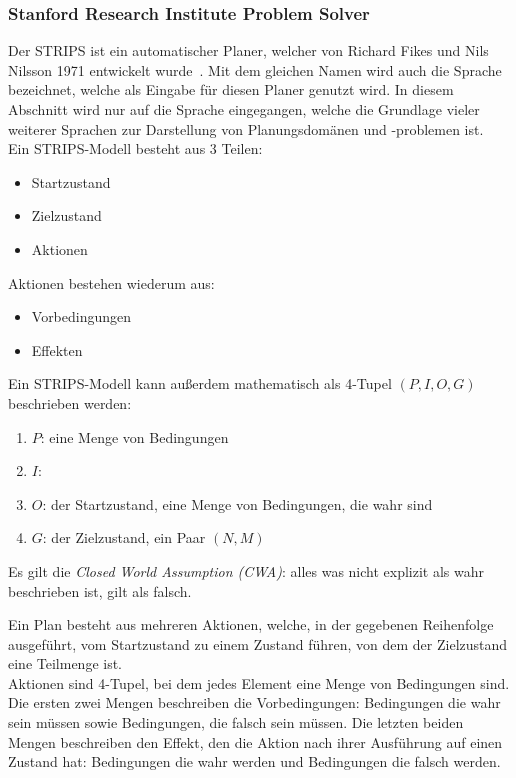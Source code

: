 \subsubsection{Stanford Research Institute Problem Solver}{\label{chap:strips}}
Der \ac{STRIPS} ist ein automatischer Planer, welcher von Richard Fikes und Nils Nilsson 1971 entwickelt wurde~\cite{FIKES1971189}.
Mit dem gleichen Namen wird auch die Sprache bezeichnet, welche als Eingabe für diesen Planer genutzt wird.
In diesem Abschnitt wird nur auf die Sprache eingegangen, welche die Grundlage vieler weiterer Sprachen zur Darstellung von Planungsdomänen und -problemen ist.\\
Ein \ac{STRIPS}-Modell besteht aus 3 Teilen:
\begin{itemize}
    \item Startzustand
    \item Zielzustand
    \item Aktionen
\end{itemize}
Aktionen bestehen wiederum aus:
\begin{itemize}
    \item Vorbedingungen
    \item Effekten
\end{itemize}
Ein \ac{STRIPS}-Modell kann außerdem mathematisch als 4-Tupel \((P,I,O,G)\) beschrieben werden:
\begin{enumerate}
    \item \(P\): eine Menge von Bedingungen
    \item \(I\):
    \item \(O\): der Startzustand, eine Menge von Bedingungen, die wahr sind
    \item \(G\): der Zielzustand, ein Paar \((N,M)\)
\end{enumerate}
Es gilt die \emph{Closed World Assumption (CWA)}: alles was nicht explizit als wahr beschrieben ist, gilt als falsch.

Ein Plan besteht aus mehreren Aktionen, welche, in der gegebenen Reihenfolge ausgeführt, vom Startzustand zu einem Zustand führen, von dem der Zielzustand eine Teilmenge ist.\\
Aktionen sind 4-Tupel, bei dem jedes Element eine Menge von Bedingungen sind.
Die ersten zwei Mengen beschreiben die Vorbedingungen: Bedingungen die wahr sein müssen sowie Bedingungen, die falsch sein müssen.
Die letzten beiden Mengen beschreiben den Effekt, den die Aktion nach ihrer Ausführung auf einen Zustand hat: Bedingungen die wahr werden und Bedingungen die falsch werden.
